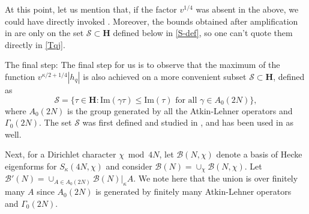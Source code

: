 \documentclass[11pt]{amsart}
\makeatletter
\numberwithin{equation}{section}
\renewcommand\subsubsection{\@secnumfont}{\bfseries}%
\renewcommand\subsubsection{\@startsection{subsubsection}{3}
  \z@{.5\linespacing\@plus.7\linespacing}{-.5em}%
  {\normalfont\bfseries}}
\theoremstyle{plain}
\theoremstyle{definition}
\newcommand{\h}{\mf H}
\newcommand{\mf}{\mathbf}
\newcommand{\mc}{\mathcal}
\newcommand{\mrm}{\mathrm}
\newcommand{\im}{\mrm{Im}}
\makeatother
\begin{document}
At this point, let us mention that, if the factor $v^{1/4}$ was absent in the above, we could have directly invoked \cite{Kir}. Moreover, the bounds obtained after amplification in \cite{Kir} are only on the set $\mc S \subset \h$ defined below in \eqref{S-def}, so one can't quote them directly in \eqref{Tqj}.

\subsubsection{The final step:} \label{key-point}
The final step for us is to observe that the maximum of the function $v^{\kappa/2+1/4} \left| h_q \right|$ is also achieved on a more convenient subset $\mc S \subset \h$, defined as
\begin{equation} \label{S-def}
    \mc S=\{\tau\in\h : \im ( \gamma\tau) \le \im (\tau) \text{ for all } \gamma\in A_0(2N) \},
\end{equation}
where $A_0(2N)$ is the group generated by all the Atkin-Lehner operators and $\Gamma_0(2N)$. The set $\mc S$ was first defined and studied in \cite{HT}, and has been used in \cite{Kir} as well.

Next, for a Dirichlet character $\chi\bmod 4N$, let $\mc B(N, \chi)$ denote a basis of Hecke eigenforms for $S_\kappa(4N,\chi)$ and consider $\mc B(N)=\cup_\chi \mc B(N, \chi)$. Let $\mc B'(N)=\cup_{A\in A_0(2N)} \mc B(N)|_\kappa A$. We note here that the union is over finitely many $A$ since $A_0(2N)$ is generated by finitely many Atkin-Lehner operators and $\Gamma_0(2N)$.
\end{document}
